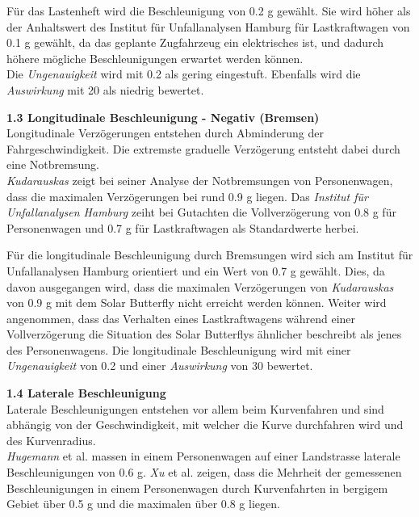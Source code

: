 \begin{description}
    Für das Lastenheft wird die Beschleunigung von 0.2 g gewählt. Sie wird höher als der Anhaltswert des Institut für Unfallanalysen Hamburg für Lastkraftwagen von 0.1 g gewählt, da das geplante Zugfahrzeug ein elektrisches ist, und dadurch höhere mögliche Beschleunigungen erwartet werden können.\\
    Die \emph{Ungenauigkeit} wird mit 0.2 als gering eingestuft. Ebenfalls wird die \emph{Auswirkung} mit 20 als niedrig bewertet.

    \item \textbf{1.3 Longitudinale Beschleunigung - Negativ (Bremsen)}\\
    Longitudinale Verzögerungen entstehen durch Abminderung der Fahrgeschwindigkeit. Die extremste graduelle Verzögerung entsteht dabei durch eine Notbremsung.\\
    \emph{Kudarauskas} \cite{Verz.1} zeigt bei seiner Analyse der Notbremsungen von Personenwagen, dass die maximalen Verzögerungen bei rund 0.9 g liegen. Das \emph{Institut für Unfallanalysen Hamburg} \cite{Verz.2} zeiht bei Gutachten die Vollverzögerung von 0.8 g für Personenwagen und 0.7 g für Lastkraftwagen als Standardwerte herbei.

    Für die longitudinale Beschleunigung durch Bremsungen wird sich am Institut für Unfallanalysen Hamburg orientiert und ein Wert von 0.7 g gewählt. Dies, da davon ausgegangen wird, dass die maximalen Verzögerungen von \emph{Kudarauskas} von 0.9 g mit dem Solar Butterfly nicht erreicht werden können. Weiter wird angenommen, dass das Verhalten eines Lastkraftwagens während einer Vollverzögerung die Situation des Solar Butterflys ähnlicher beschreibt als jenes des Personenwagens.
    Die longitudinale Beschleunigung wird mit einer \emph{Ungenauigkeit} von 0.2 und einer \emph{Auswirkung} von 30 bewertet.

    \item \textbf{1.4 Laterale Beschleunigung}\\
    Laterale Beschleunigungen entstehen vor allem beim Kurvenfahren und sind abhängig von der Geschwindigkeit, mit welcher die Kurve durchfahren wird und des Kurvenradius.\\
    \emph{Hugemann} et al. \cite{Kurv.1} massen in einem Personenwagen auf einer Landstrasse laterale Beschleunigungen von 0.6 g. \emph{Xu} et al. \cite{Kurv.2} zeigen, dass die Mehrheit der gemessenen Beschleunigungen in einem Personenwagen durch Kurvenfahrten in bergigem Gebiet über 0.5 g und die maximalen über 0.8 g liegen.


\end{description}
